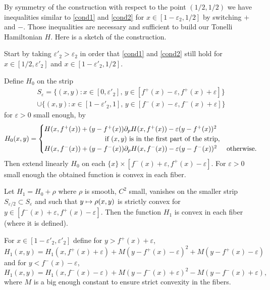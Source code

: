 \documentclass[JEP,XML,SOM,Unicode,NoFloatCountersInSection,published]{cedram}
\newcommand\mto{\mathchoice{\longmapsto}{\mapsto}{\mapsto}{\mapsto}}
\theoremstyle{definition}
\begin{document}
\begin{appendix}
By symmetry of the construction with respect to the point $(1/2,1/2)$ we have inequalities similar to \eqref {cond1} and \eqref{cond2} for $x\in [1-\varepsilon_2,1/2]$ by switching $+$ and $-$. Those inequalities are necessary and sufficient to build our Tonelli Hamiltonian $H$. Here is a sketch of the construction.

Start by taking $\varepsilon'_2>\varepsilon_2$ in order that \eqref {cond1} and \eqref{cond2} still hold for $x\in [1/2,\varepsilon'_2]$ and $x\in [1-\varepsilon'_2,1/2]$.

Define $H_0$ on the strip\vspace*{-5pt}
\begin{multline*}
S_\varepsilon = \bigl\{(x,y): x\in [0,\varepsilon'_2],\, y\in [f^+(x)-\varepsilon, f^+(x)+\varepsilon]\bigr\}\\
\cup \bigl\{(x,y): x\in [1-\varepsilon'_2,1],\, y\in [f^-(x)-\varepsilon, f^-(x)+\varepsilon]\bigr\}
\end{multline*}
for $\varepsilon>0$
small enough, by\vspace*{-2pt}
\[
H_0(x,y) =
\begin{cases}
H(x,f^+(x)) + (y-f^+(x)) \partial_pH(x,f^+(x))-\varepsilon(y-f^+(x))^2\\
\hspace*{3cm}\text{ if $(x,y)$ is in the first part of the strip},\\
H(x,f^-(x)) + (y-f^-(x)) \partial_pH(x,f^-(x))- \varepsilon(y-f^-(x))^2& \text{otherwise.}
\end{cases}
\]
Then extend linearly $H_0$ on each $\{x\}\times [f^-(x)+\varepsilon, f^+(x)-\varepsilon]$. For $\varepsilon>0$ small enough the obtained function is convex in each fiber.

Let $H_1 = H_0+\rho$ where $\rho $ is smooth, $C^2$ small, vanishes on the smaller strip $S_{\varepsilon/2} \subset S_\varepsilon$ and such that $y\mto \rho(x,y)$ is strictly convex for $y\in [f^-(x)+\varepsilon, f^+(x)-\varepsilon]$. Then the function $H_1$ is convex in each fiber (where it is defined).

For $x\in [1-\varepsilon'_2, \varepsilon'_2]$ define for $y>f^+(x)+\varepsilon$,
\[
H_1(x,y) = H_1(x,f^+(x)+\varepsilon) + M(y-f^+(x)-\varepsilon)^2+ M(y-f^+(x)-\varepsilon)
\]
and for
$y<f^-(x)-\varepsilon$,
\[
H_1(x,y) = H_1(x,f^-(x)-\varepsilon) + M(y-f^-(x)+\varepsilon)^2- M(y-f^-(x)+\varepsilon),
\]
where $M$ is a big enough constant to ensure strict convexity in the fibers.


\end{appendix}
\end{document}
